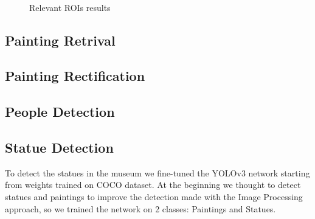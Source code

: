 \documentclass[10pt,twocolumn,letterpaper]{article}
\begin{document}
\begin{figure}
    \\
    \caption{Relevant ROIs results}
    \label{fig:foobar}
\end{figure}

\subsection{Painting Retrival}

\subsection{Painting Rectification}

\subsection{People Detection}

\subsection{Statue Detection}

To detect the statues in the museum we fine-tuned the YOLOv3 network starting from
weights trained on COCO dataset. At the beginning we thought to detect statues and paintings
to improve the detection made with the Image Processing approach, so we trained the network
on 2 classes: Paintings and Statues.
\end{document}
